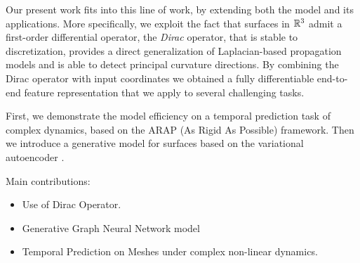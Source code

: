 Our present work fits into this line of work, by extending both the model 
and its applications. More specifically, we exploit the fact that surfaces in 
${\mathbb{R}}^3$ admit a first-order differential operator, the \emph{Dirac} operator, that
is stable to discretization, provides a direct generalization of Laplacian-based 
propagation models and is able to detect principal curvature directions. 
By combining the Dirac operator with input coordinates we obtained a fully differentiable
end-to-end feature representation that we apply to several challenging tasks. 

First, we demonstrate the model efficiency on a temporal prediction task 
of complex dynamics, based on the ARAP (As Rigid As Possible) framework. 
Then we introduce a generative model for surfaces based on 
the variational autoencoder \cite{kingma, danilo}.

Main contributions:
\begin{itemize}
\item Use of Dirac Operator. 
\item Generative Graph Neural Network model
\item Temporal Prediction on Meshes under complex non-linear dynamics. 
\end{itemize}



%
